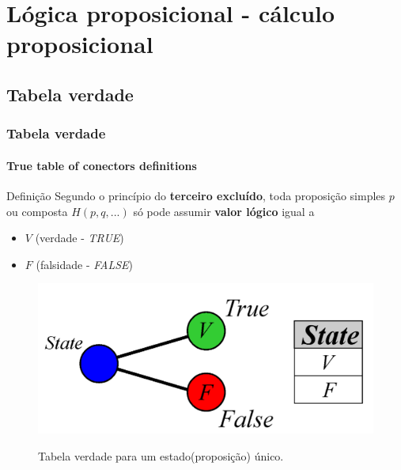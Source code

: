 \documentclass[10pt, headsepline, captions=tableabove,xcolor=table]{beamer}
\begin{document}
\section{Lógica proposicional - cálculo proposicional}
%
\subsection{Tabela verdade}
%
\begin{frame}[t]
    \frametitle{Tabela verdade}
    \framesubtitle{True table of conectors definitions}
    \begin{alertblock}{Definição}
        \small
        Segundo o princípio do \textbf{terceiro excluído}, toda proposição simples $p$ ou composta $H(p,q,...)$ só pode assumir \textbf{valor lógico} igual a \\
        \begin{itemize}
            \item $V$ (verdade - \textit{TRUE})
            \item $F$ (falsidade - \textit{FALSE})
        \end{itemize}
    \end{alertblock}
    \vspace{-4mm}
    \begin{figure}[c]
        \centering
        \caption{Tabela verdade para um estado(proposição) único.}
        \includegraphics[scale=0.25]{TT2.png}
        \label{fig:tabela-verdade1}         
    \end{figure}
\end{frame}
%
\end{document}
